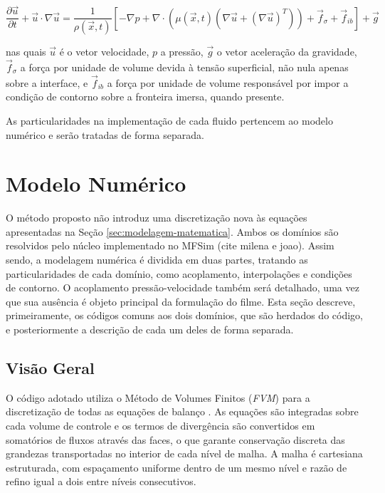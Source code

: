 \begin{equation}
    \frac{\partial \vec{u}}{\partial t} + \vec{u} \cdot \nabla \vec{u}
    = \frac{1}{\rho (\vec{x},t)} \left[
        - \nabla p
        + \nabla \cdot \left( \mu (\vec{x},t) \left( \nabla \vec{u} + (\nabla \vec{u})^{T} \right) \right)
        + \vec{f}_{\sigma}
        + \vec{f}_{ib}
    \right]
    + \vec{g}
    \label{eq:navier-stokes-incompressivel-completa}
\end{equation}

nas quais $\vec{u}$ é o vetor velocidade, $p$ a pressão, $\vec{g}$ o vetor aceleração da gravidade, $\vec{f}_{\sigma}$ a força por unidade de volume devida à tensão superficial, não nula apenas sobre a interface, e $\vec{f}_{ib}$ a força por unidade de volume responsável por impor a condição de contorno sobre a fronteira imersa, quando presente.

As particularidades na implementação de cada fluido pertencem ao modelo numérico e serão tratadas de forma separada.

\section{Modelo Numérico}

O método proposto não introduz uma discretização nova às equações apresentadas na Seção \ref{sec:modelagem-matematica}. Ambos os domínios são resolvidos pelo núcleo implementado no MFSim (cite milena e joao). Assim sendo, a modelagem numérica é dividida em duas partes, tratando as particularidades de cada domínio, como acoplamento, interpolações e condições de contorno. O acoplamento pressão-velocidade também será detalhado, uma vez que sua ausência é objeto principal da formulação do filme. Esta seção descreve, primeiramente, os códigos comuns aos dois domínios, que são herdados do código, e posteriormente a descrição de cada um deles de forma separada.

\subsection{Visão Geral}

O código adotado utiliza o Método de Volumes Finitos (\textit{FVM}) para a discretização de todas as equações de balanço \cite{versteeg2007}. As equações são integradas sobre cada volume de controle e os termos de divergência são convertidos em somatórios de fluxos através das faces, o que garante conservação discreta das grandezas transportadas no interior de cada nível de malha. A malha é cartesiana estruturada, com espaçamento uniforme dentro de um mesmo nível e razão de refino igual a dois entre níveis consecutivos.

